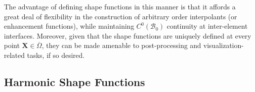 	
	The advantage of defining shape functions in this manner is that it affords a great deal of flexibility in the construction of arbitrary order interpolants (or enhancement functions), while maintaining $C^0 (\mathcal{B}_0)$ continuity at inter-element interfaces. Moreover, given that the shape functions are uniquely defined at every point $\bm{X} \in \overline{\Omega}$, they can be made amenable to post-processing and visualization-related tasks, if so desired.
	

\subsection*{Harmonic Shape Functions}


